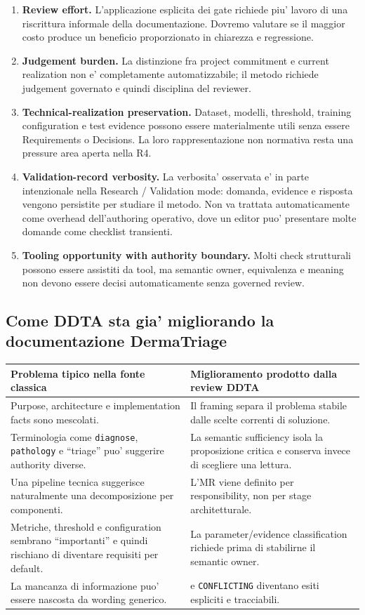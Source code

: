 \documentclass[11pt,a4paper]{article}
\begin{document}
\begin{enumerate}
  \item \textbf{Review effort.} L'applicazione esplicita dei gate richiede piu' lavoro di una riscrittura informale della documentazione. Dovremo valutare se il maggior costo produce un beneficio proporzionato in chiarezza e regressione.
  \item \textbf{Judgement burden.} La distinzione fra project commitment e current realization non e' completamente automatizzabile; il metodo richiede judgement governato e quindi disciplina del reviewer.
  \item \textbf{Technical-realization preservation.} Dataset, modelli, threshold, training configuration e test evidence possono essere materialmente utili senza essere Requirements o Decisions. La loro rappresentazione non normativa resta una pressure area aperta nella R4.
  \item \textbf{Validation-record verbosity.} La verbosita' osservata e' in parte intenzionale nella Research / Validation mode: domanda, evidence e risposta vengono persistite per studiare il metodo. Non va trattata automaticamente come overhead dell'authoring operativo, dove un editor puo' presentare molte domande come checklist transienti.
  \item \textbf{Tooling opportunity with authority boundary.} Molti check strutturali possono essere assistiti da tool, ma semantic owner, equivalenza e meaning non devono essere decisi automaticamente senza governed review.
\end{enumerate}

\subsection{Come DDTA sta gia' migliorando la documentazione DermaTriage}

\begin{tabularx}{\textwidth}{L{52mm}Y}
\toprule
\textbf{Problema tipico nella fonte classica} & \textbf{Miglioramento prodotto dalla review DDTA} \\
\midrule
Purpose, architecture e implementation facts sono mescolati. & Il framing separa il problema stabile dalle scelte correnti di soluzione. \\
Terminologia come \texttt{diagnose}, \texttt{pathology} e ``triage'' puo' suggerire authority diverse. & La semantic sufficiency isola la proposizione critica e conserva \NS{} invece di scegliere una lettura. \\
Una pipeline tecnica suggerisce naturalmente una decomposizione per componenti. & L'MR viene definito per responsibility, non per stage architetturale. \\
Metriche, threshold e configuration sembrano ``importanti'' e quindi rischiano di diventare requisiti per default. & La parameter/evidence classification richiede prima di stabilirne il semantic owner. \\
La mancanza di informazione puo' essere nascosta da wording generico. & \NS{} e \texttt{CONFLICTING} diventano esiti espliciti e tracciabili. \\
\bottomrule
\end{tabularx}
\end{document}
